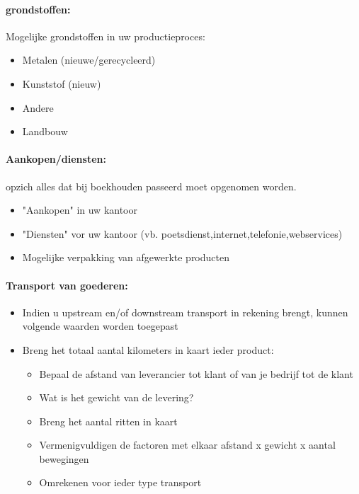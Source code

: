 \documentclass[12pt]{article}
\begin{document}
\paragraph{grondstoffen:}
Mogelijke grondstoffen in uw productieproces:
\begin{itemize}
    \item Metalen (nieuwe/gerecycleerd)
    \item Kunststof (nieuw)
    \item Andere 
    \item Landbouw 
\end{itemize}
\paragraph{Aankopen/diensten:}
opzich alles dat bij boekhouden passeerd moet opgenomen worden.
\begin{itemize}
    \item "Aankopen" in uw kantoor
    \item "Diensten" vor uw kantoor (vb. poetsdienst,internet,telefonie,webservices)
    \item Mogelijke verpakking van afgewerkte producten
\end{itemize}
\paragraph{Transport van goederen:}
\begin{itemize}
    \item Indien u upstream en/of downstream transport in rekening brengt, kunnen volgende
    waarden worden toegepast
    \item Breng het totaal aantal kilometers in kaart ieder product:\begin{itemize}
        \item Bepaal de afstand van leverancier tot klant of van je bedrijf tot de klant
        \item Wat is het gewicht van de levering?
        \item Breng het aantal ritten in kaart
        \item Vermenigvuldigen de factoren met elkaar afstand x gewicht x aantal bewegingen
        \item Omrekenen voor ieder type transport
    \end{itemize}
\end{itemize}
\end{document}
